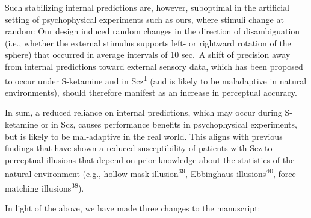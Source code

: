 \documentclass[
]{article}
\begin{document}
Such stabilizing internal predictions are, however, suboptimal in the
artificial setting of psychophysical experiments such as ours, where
stimuli change at random: Our design induced random changes in the
direction of disambiguation (i.e., whether the external stimulus
supports left- or rightward rotation of the sphere) that occurred in
average intervals of 10 sec.~A shift of precision away from internal
predictions toward external sensory data, which has been proposed to
occur under S-ketamine and in Scz\textsuperscript{1} (and is likely to
be maladaptive in natural environments), should therefore manifest as an
increase in perceptual accuracy.

In sum, a reduced reliance on internal predictions, which may occur
during S-ketamine or in Scz, causes performance benefits in
psychophysical experiments, but is likely to be mal-adaptive in the real
world. This aligns with previous findings that have shown a reduced
susceptibility of patients with Scz to perceptual illusions that depend
on prior knowledge about the statistics of the natural environment
(e.g., hollow mask illusion\textsuperscript{39}, Ebbinghaus
illusions\textsuperscript{40}, force matching
illusions\textsuperscript{38}).

In light of the above, we have made three changes to the manuscript:
\end{document}
